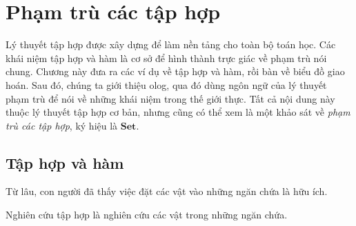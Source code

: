 \providecommand{\ctsmiley}{\mathord{\tikz[baseline=-.5ex,x=.7ex,y=.7ex]{\draw (0,0) circle (1);\fill (-.35,.3) circle (.09);\fill (.35,.3) circle (.09);\draw (-.5,-.15) arc[start angle=210,end angle=330,radius=.58];}}}
\providecommand{\cttype}[1]{\(\ulcorner\)#1\(\urcorner\)}
\chapter{Phạm trù các tập hợp}
Lý thuyết tập hợp được xây dựng để làm nền tảng cho toàn bộ toán học. Các khái niệm tập hợp và hàm là cơ sở để hình thành trực giác về phạm trù nói chung. Chương này đưa ra các ví dụ về tập hợp và hàm, rồi bàn về biểu đồ giao hoán. Sau đó, chúng ta giới thiệu olog, qua đó dùng ngôn ngữ của lý thuyết phạm trù để nói về những khái niệm trong thế giới thực. Tất cả nội dung này thuộc lý thuyết tập hợp cơ bản, nhưng cũng có thể xem là một khảo sát về \emph{phạm trù các tập hợp}, ký hiệu là $\mathbf{Set}$.
\section{Tập hợp và hàm}
Từ lâu, con người đã thấy việc đặt các vật vào những ngăn chứa là hữu ích.
\begin{center}\end{center}
Nghiên cứu tập hợp là nghiên cứu các vật trong những ngăn chứa.
